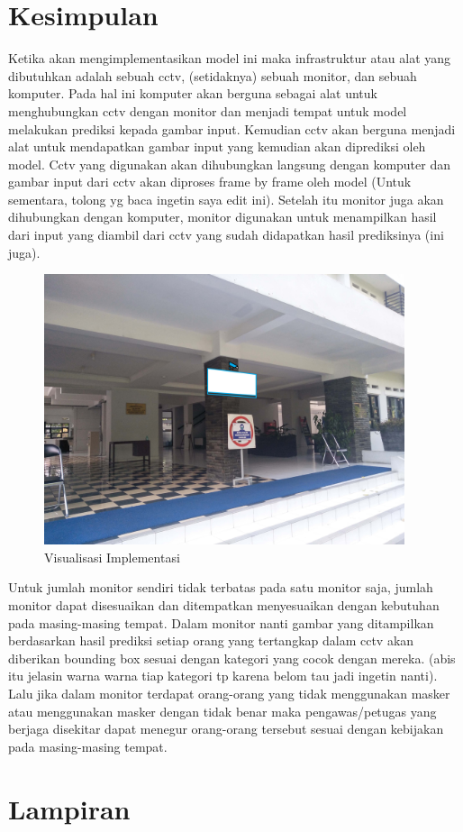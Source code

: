 \documentclass{article}
\begin{document}
  \section{Kesimpulan}
  	Ketika akan mengimplementasikan model ini maka infrastruktur atau alat yang dibutuhkan adalah sebuah cctv, (setidaknya) sebuah monitor, dan sebuah komputer. Pada hal ini komputer akan berguna sebagai alat untuk menghubungkan cctv dengan monitor dan menjadi tempat untuk model melakukan prediksi kepada gambar input. Kemudian cctv akan berguna menjadi alat untuk mendapatkan gambar input yang kemudian akan diprediksi oleh model. Cctv yang digunakan akan dihubungkan langsung dengan komputer dan gambar input dari cctv akan diproses frame by frame oleh model (Untuk sementara, tolong yg baca ingetin saya edit ini). Setelah itu monitor juga akan dihubungkan dengan komputer, monitor digunakan untuk menampilkan hasil dari input yang diambil dari cctv yang sudah didapatkan hasil prediksinya (ini juga). 
  	\begin{figure}[H]
  		\centering
  		\includegraphics[width=400px]{implementasi/test.jpg}
  		\caption{Visualisasi Implementasi}
  	\end{figure}
	\par Untuk jumlah monitor sendiri tidak terbatas pada satu monitor saja, jumlah monitor dapat disesuaikan dan ditempatkan menyesuaikan dengan kebutuhan pada masing-masing tempat. Dalam monitor nanti gambar yang ditampilkan berdasarkan hasil prediksi setiap orang yang tertangkap dalam cctv akan diberikan bounding box sesuai dengan kategori yang cocok dengan mereka. (abis itu jelasin warna warna tiap kategori tp karena belom tau jadi ingetin nanti). Lalu jika dalam monitor terdapat orang-orang yang tidak menggunakan masker atau menggunakan masker dengan tidak benar maka pengawas/petugas yang berjaga disekitar dapat menegur orang-orang tersebut sesuai dengan kebijakan pada masing-masing tempat.
  \section{Lampiran}
  \newpage
  \printbibliography[title={Referensi}]
\end{document}
